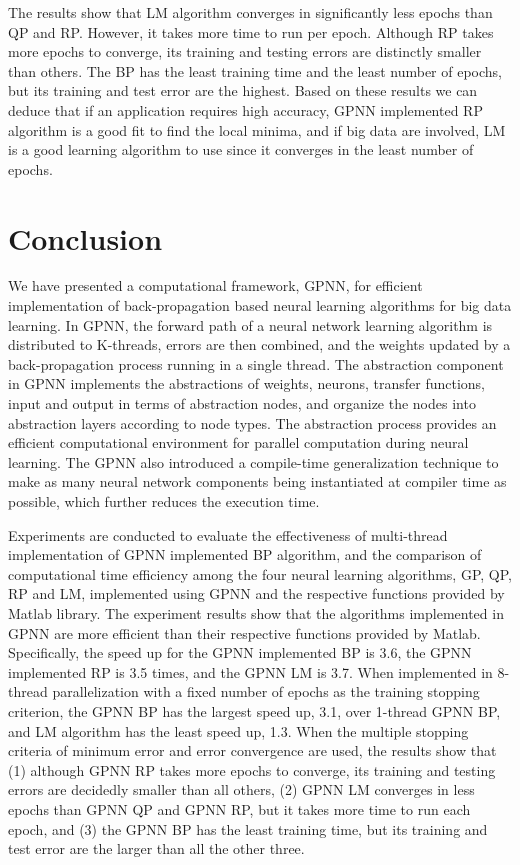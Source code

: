 \documentclass[procedia]{easychair}
\begin{document}
The results show that LM algorithm converges in significantly less epochs than QP and RP.  However, it takes more time to run per epoch.  Although RP takes more epochs to converge, its training and testing errors are distinctly smaller than others.  The BP has the least training time and the least number of epochs, but its training and test error are the highest.  Based on these results we can deduce that if an application requires high accuracy, GPNN implemented RP algorithm is a good fit to find the local minima, and if big data are involved, LM is a good learning algorithm to use since it converges in the least number of epochs.


\section{Conclusion}
\label{section:conclusion}

We have presented a computational framework, GPNN, for efficient implementation of back-propagation based neural learning algorithms for big data learning. In GPNN, the forward path of a neural network learning algorithm is distributed to K-threads, errors are then combined, and the weights updated by a back-propagation process running in a single thread.   The abstraction component in GPNN implements the abstractions of weights, neurons, transfer functions, input and output in terms of abstraction nodes, and organize the nodes into abstraction layers according to node types. The abstraction process provides an efficient computational environment for parallel computation during neural learning.  The GPNN also introduced a compile-time generalization technique to make as many neural network components being instantiated at compiler time as possible, which further reduces the execution time.

Experiments are conducted to evaluate the effectiveness of multi-thread implementation of GPNN implemented BP algorithm, and the comparison of computational time efficiency among the four neural learning algorithms, GP, QP, RP and LM, implemented using GPNN and the respective functions provided by Matlab library.  The experiment results show that the algorithms implemented in GPNN are more efficient than their respective functions provided by Matlab.  Specifically, the speed up for the GPNN implemented BP is 3.6, the GPNN implemented RP is 3.5 times, and the GPNN LM is 3.7.  When implemented in 8-thread parallelization with a fixed number of epochs as the training stopping criterion, the GPNN BP has the largest speed up, 3.1, over 1-thread GPNN BP, and LM algorithm has the least speed up, 1.3.  When the multiple stopping criteria of minimum error and error convergence are used, the results show that (1) although GPNN RP takes more epochs to converge, its training and testing errors are decidedly smaller than all others, (2) GPNN LM converges in less epochs than GPNN QP and GPNN RP, but it takes more time to run each epoch, and (3) the GPNN BP has the least training time, but its training and test error are the larger than all the other three.
\end{document}
